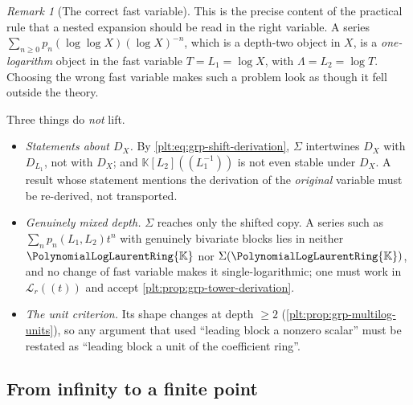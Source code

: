 \documentclass[11pt,oneside]{article}
\theoremstyle{plain}
\theoremstyle{definition}
\theoremstyle{remark}
\newtheorem{remark}[theorem]{Remark}
\newcommand{\K}{\mathbb{K}}
\newcommand{\PLlau}{\PolynomialLogLaurentRing{\K}}       %
\newcommand{\DX}{D_{X}}                                  %
\begin{document}
\begin{remark}[The correct fast variable]
This is the precise content of the practical rule that a nested expansion
should be read in the right variable.  A series
\(\sum_{n\ge0}p_n(\log\log X)(\log X)^{-n}\), which is a depth-two object in
\(X\), is a \emph{one-logarithm} object in the fast variable
\(T=L_1=\log X\), with \(\Lambda=L_2=\log T\).  Choosing the wrong fast
variable makes such a problem look as though it fell outside the theory.
\end{remark}

\begin{warningbox}
Three things do \emph{not} lift.
\begin{itemize}
\item \emph{Statements about \(\DX\).}  By
\eqref{plt:eq:grp-shift-derivation}, \(\Sigma\) intertwines \(\DX\) with
\(D_{L_1}\), not with \(\DX\); and \(\K[L_2]((L_1^{-1}))\) is not even stable
under \(\DX\).  A result whose statement mentions the derivation of the
\emph{original} variable must be re-derived, not transported.
\item \emph{Genuinely mixed depth.}  \(\Sigma\) reaches only the shifted copy.
A series such as \(\sum_np_n(L_1,L_2)t^n\) with genuinely bivariate blocks lies
in neither \(\PLlau\) nor \(\Sigma(\PLlau)\), and no change of fast variable
makes it single-logarithmic; one must work in \(\mathcal L_r((t))\) and accept
\cref{plt:prop:grp-tower-derivation}.
\item \emph{The unit criterion.}  Its shape changes at depth \(\ge2\)
(\cref{plt:prop:grp-multilog-units}), so any argument that used
``leading block a nonzero scalar'' must be restated as ``leading block a unit
of the coefficient ring''.
\end{itemize}
\end{warningbox}

\subsection{From infinity to a finite point}
\end{document}
